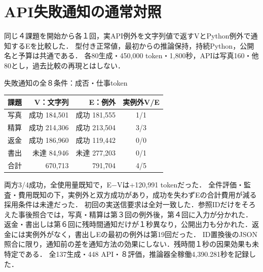 \section{API失敗通知の通常対照}
同じ４課題を開始から各１回，実API例外を文字列値で返すVとPython例外で通知するEを比較した．
型付き正常値，最初からの推論保持，持続Python，公開名と予算は共通である．
各80生成・450,000 token・1,800秒，APIは写真160・他80とし，過去比較の再現とはしない．
\begin{center}\begin{minipage}{\columnwidth}\centering
\small 失敗通知の全８条件：成否・仕事token\par\smallskip
\begin{tabular}{lrrc}\hline 課題 & V：文字列 & E：例外 & 実例外V/E\\\hline
写真 & 成功 184,501 & 成功 181,555 & 1/1\\
精算 & 成功 214,306 & 成功 213,504 & 3/3\\
返金 & 成功 186,960 & 成功 119,442 & 0/0\\
書出 & 未達 84,946 & 未達 277,203 & 0/1\\
\hline
合計 & 670,713 & 791,704 & 4/5\\
\hline\end{tabular}\end{minipage}\end{center}
両方3/4成功，全使用量既知で，E$-$Vは+120,991 tokenだった．
全件評価・監査・費用既知の下，実例外と双方成功があり，成功を失わずEの合計費用が減る採用条件は未達だった．
初回の実送信要求は全対一致した．参照IDだけをそろえた事後照合では，写真・精算は第３回の例外後，第４回に入力が分かれた．
返金・書出しは第６回に残時間通知だけが１秒異なり，公開出力も分かれた．返金には実例外がなく，書出しEの最初の例外は第19回だった．
ID置換後のJSON照合に限り，通知前の差を通知方法の効果にしない．残時間１秒の因果効果も未特定である．
全137生成・448 API・８評価，推論器全稼働4,390.281秒を記録した．
